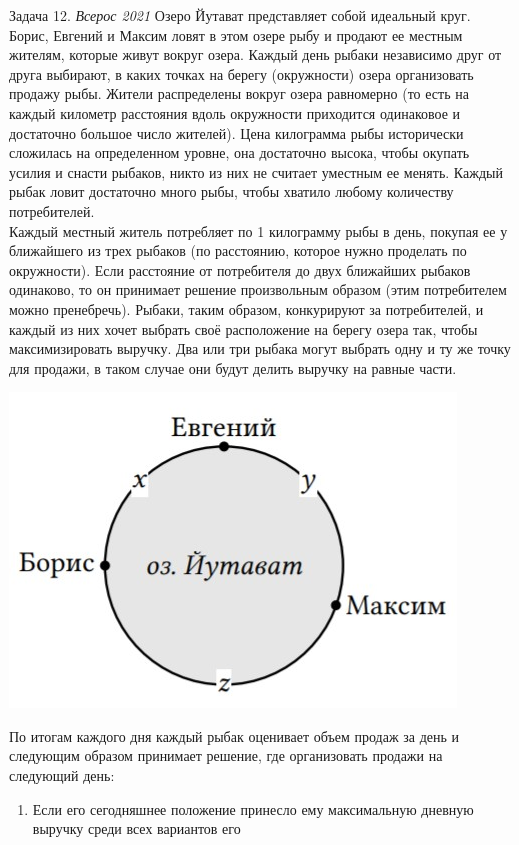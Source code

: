 \begin{mybox}{Задача 12. \textit{Всерос 2021}}
    \indent\setlength{\parindent}{1em}\indent\setlength{\parindent}{1em}Озеро Йутават представляет собой идеальный
    круг. Борис, Евгений и Максим ловят в этом озере рыбу и продают ее местным жителям, которые живут вокруг озера.
    Каждый день рыбаки независимо друг от друга выбирают, в каких точках на берегу (окружности) озера организовать
    продажу рыбы. Жители распределены вокруг озера равномерно (то есть на каждый километр расстояния вдоль окружности
    приходится одинаковое и достаточно большое число жителей). Цена килограмма рыбы исторически сложилась на
    определенном уровне, она достаточно высока, чтобы окупать усилия и снасти рыбаков, никто из них не считает
    уместным ее менять. Каждый рыбак ловит достаточно много рыбы, чтобы хватило любому количеству потребителей.\\
    \indent\setlength{\parindent}{1em}Каждый местный житель потребляет по 1 килограмму рыбы в день, покупая ее у
    ближайшего из трех рыбаков (по расстоянию, которое нужно проделать по окружности). Если расстояние от потребителя
    до двух ближайших рыбаков одинаково, то он принимает решение произвольным образом (этим потребителем можно
    пренебречь). Рыбаки, таким образом, конкурируют за потребителей, и каждый из них хочет выбрать своё расположение
    на берегу озера так, чтобы максимизировать выручку. Два или три рыбака могут выбрать одну и ту же точку для
    продажи, в таком случае они будут делить выручку на равные части.
    \begin{center}
        \includegraphics[width=0.5\linewidth]{static/4_11}
    \end{center}
    \indent\setlength{\parindent}{1em}\indent\setlength{\parindent}{1em}По итогам каждого дня каждый рыбак оценивает
    объем продаж за день и следующим образом принимает решение, где организовать продажи на следующий день:
    \begin{enumerate}
        \item Если его сегодняшнее положение принесло ему максимальную дневную выручку среди всех вариантов его

\end{enumerate}
\end{mybox}
